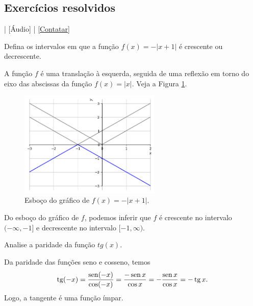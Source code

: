 \subsection*{Exercícios resolvidos}

\begin{flushright}
  [Vídeo] | [Áudio] | \href{https://phkonzen.github.io/notas/contato.html}{[Contatar]}
\end{flushright}

\begin{exeresol}
  Defina os intervalos em que a função $f(x) = -|x+1|$ é crescente ou decrescente.
\end{exeresol}
\begin{resol}
  A função $f$ é uma translação à esquerda, seguida de uma reflexão em torno do eixo das abscissas da função $f(x) = |x|$. Veja a Figura \ref{fig:exeresol_funprop_mono}.

  \begin{figure}[H]
    \centering
    \includegraphics[width=0.6\textwidth]{./cap_funcao/dados/fig_exeresol_funprop_mono/fig_exeresol_funprop_mono.png}
    \caption{Esboço do gráfico de $f(x) = -|x+1|$.}
    \label{fig:exeresol_funprop_mono}
  \end{figure}

  Do esboço do gráfico de $f$, podemos inferir que $f$ é crescente no intervalo $(-\infty, -1]$ e decrescente no intervalo $[-1, \infty)$.
\end{resol}

\begin{exeresol}
  Analise a paridade da função $tg(x)$.
\end{exeresol}
\begin{resol}
  Da paridade das funções seno e cosseno, temos
  \begin{equation}
    \operatorname{tg}(-x) = \frac{\operatorname{sen}(-x)}{\cos(-x)} = \frac{-\operatorname{sen} x}{\cos x} = -\frac{\operatorname{sen} x}{\cos x} = -\operatorname{tg} x.
  \end{equation}
  Logo, a tangente é uma função ímpar.
\end{resol}

